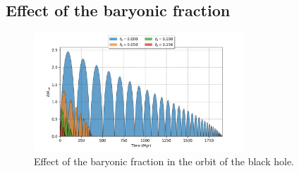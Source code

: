	\subsection{Effect of the baryonic fraction}
	\begin{figure}[h]
		\centering
		\includegraphics[width = 0.7\textwidth]{"../Files/Week 5/baryonic_fraction_comparison"}
		\caption{Effect of the baryonic fraction in the orbit of the black hole.}
		\label{fig: baryonicfraction}
	\end{figure}
		
